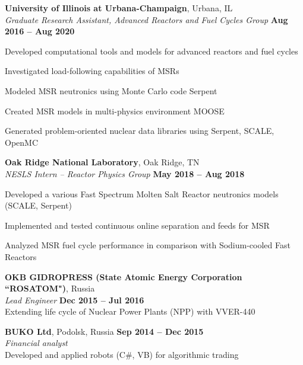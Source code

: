 \documentclass[margin,line]{resume}
\begin{document}
\begin{resume}
    \textbf{University of Illinois at Urbana-Champaign}, Urbana, IL\\
		\textsl{Graduate Research Assistant, Advanced Reactors and Fuel Cycles 
		Group} \hfill \textbf{Aug 2016 -- Aug 2020}\\
                \vspace{-4mm}\begin{list2}
                \item Developed computational tools and models for advanced 
                reactors and fuel cycles
                \item Investigated load-following capabilities of MSRs
                \item Modeled MSR neutronics using Monte Carlo code 
                Serpent
				\item Created MSR models in multi-physics environment MOOSE
				\item Generated problem-oriented nuclear data libraries using 
				Serpent, SCALE, OpenMC
                \end{list2}

    \textbf{Oak Ridge National Laboratory}, Oak Ridge, TN\\
		\textsl{NESLS Intern -- Reactor Physics Group} \hfill \textbf{May 2018 
		-- Aug 2018}\\
                \vspace{-4mm}\begin{list2}
                \item Developed a various Fast Spectrum Molten Salt Reactor 
                neutronics models (SCALE, Serpent)
				\item Implemented and tested continuous online separation and 
				feeds for MSR
				\item Analyzed MSR fuel cycle performance in comparison with 
				Sodium-cooled Fast Reactors
                \end{list2}

    \textbf{OKB GIDROPRESS (State Atomic Energy Corporation ``ROSATOM")}, 
    Russia \\
		\textsl{Lead Engineer} \hfill \textbf{Dec 2015 -- Jul 2016}\\
                Extending life cycle of Nuclear Power Plants (NPP) with 
                VVER-440

    \textbf{BUKO Ltd}, Podolsk, Russia \hfill \textbf{Sep 2014 -- Dec 2015}\\
		\textsl{Financial analyst}\\
		Developed and applied robots (C\#, VB) for algorithmic trading


\end{resume}
\end{document}
